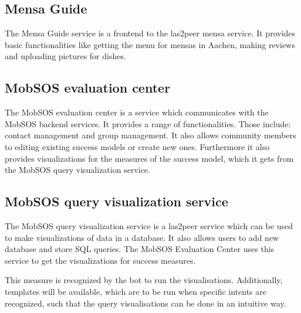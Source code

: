 \subsection{Mensa Guide}
The Mensa Guide service is a frontend to the las2peer mensa service. It provides basic functionalities like getting the menu for mensas in Aachen, making reviews and uploading pictures for dishes.  

\subsection{MobSOS evaluation center}
The MobSOS evaluation center is a service which communicates with the MobSOS backend services. It provides a range of functionalities. Those include: contact management and group management. 
It also allows community members to editing existing success models or create new ones.
Furthermore it also provides visualizations for the measures of the success model, which it gets from the MobSOS query visualization service.

\subsection{MobSOS query visualization service}
The MobSOS query visualization service is a las2peer service which can be used to make visualizations of data in a database. It also allows users to add new database and store SQL queries. The MobSOS Evaluation Center uses this service to get the visualizations for success measures.






This measure is recognized by the bot to run the visualisations. Additionally, templates will be available, which are to be run when specific intents are recognized, such that the query visualisations can be done in an intuitive way.





